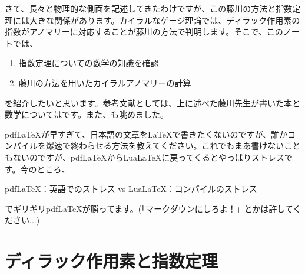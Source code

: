 \documentclass[unicode,a4paper,10pt]{ltjsarticle}
\begin{document}
さて、長々と物理的な側面を記述してきたわけですが、この藤川の方法と指数定理には大きな関係があります。カイラルなゲージ理論では、ディラック作用素の指数がアノマリーに対応することが藤川の方法で判明します。そこで、このノートでは、
\begin{enumerate}
  \item 
  指数定理についての数学の知識を確認
  \item 
  藤川の方法を用いたカイラルアノマリーの計算
\end{enumerate}
を紹介したいと思います。参考文献としては、上に述べた藤川先生が書いた本\cite{Fujikawa:2001b}と数学については\cite{Nakahara:2003}です。また、\cite{Peskin:1995,Nair:2005}も眺めました。

\begin{graybox}
  {pdf\LaTeX}が早すぎて、日本語の文章を{\LaTeX}で書きたくないのですが、誰かコンパイルを爆速で終わらせる方法を教えてください。これでもまあ書けないこともないのですが、{pdf\LaTeX}から{Lua\LaTeX}に戻ってくるとやっぱりストレスです。今のところ、
  \begin{center}
    {pdf\LaTeX}：英語でのストレス
    \quad\textrm{vs}\quad
    {Lua\LaTeX}：コンパイルのストレス
  \end{center}
  でギリギリ{pdf\LaTeX}が勝ってます。(「マークダウンにしろよ！」とかは許してください...)
\end{graybox}


\section{ディラック作用素と指数定理}













\clearpage


\end{document}
